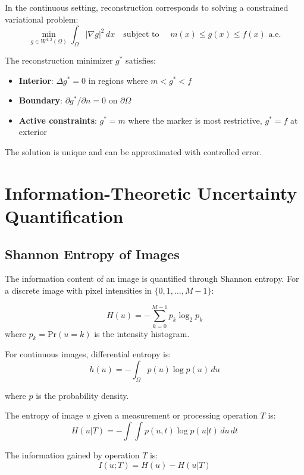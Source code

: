 \documentclass[twocolumn,11pt]{article}
\begin{document}
In the continuous setting, reconstruction corresponds to solving a constrained variational problem:
\begin{equation}
\min_{g \in W^{1,2}(\Omega)} \int_\Omega |\nabla g|^2 \, dx \quad \text{subject to } \quad m(x) \leq g(x) \leq f(x) \text{ a.e.}
\end{equation}

\begin{theorem}
The reconstruction minimizer $g^*$ satisfies:
\begin{itemize}
\item \textbf{Interior}: $\Delta g^* = 0$ in regions where $m < g^* < f$
\item \textbf{Boundary}: $\partial g^*/\partial n = 0$ on $\partial\Omega$
\item \textbf{Active constraints}: $g^* = m$ where the marker is most restrictive, $g^* = f$ at exterior
\end{itemize}

The solution is unique and can be approximated with controlled error.
\end{theorem}

\section{Information-Theoretic Uncertainty Quantification}

\subsection{Shannon Entropy of Images}

The information content of an image is quantified through Shannon entropy. For a discrete image with pixel intensities in $\{0, 1, \ldots, M-1\}$:

\begin{equation}
H(u) = -\sum_{k=0}^{M-1} p_k \log_2 p_k
\end{equation}
where $p_k = \text{Pr}(u = k)$ is the intensity histogram.

For continuous images, differential entropy is:
\begin{equation}
h(u) = -\int_\Omega p(u) \log p(u) \, du
\end{equation}

where $p$ is the probability density.

\begin{definition}
The entropy of image $u$ given a measurement or processing operation $T$ is:
\begin{equation}
H(u | T) = -\int \int p(u, t) \log p(u | t) \, du \, dt
\end{equation}

The information gained by operation $T$ is:
\begin{equation}
I(u; T) = H(u) - H(u | T)
\end{equation}
\end{definition}
\end{document}
